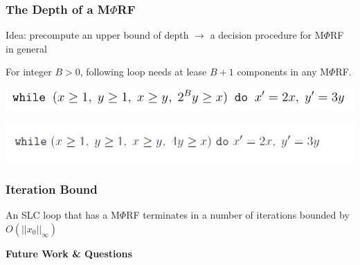 \documentclass[11pt]{beamer}
\begin{document}
\begin{frame}\frametitle{The Depth of a M$\Phi$RF}
Idea:  precompute an upper bound of depth $\rightarrow$ a decision procedure for M$\Phi$RF in general


\begin{theorem}
For integer $B > 0$, following loop needs at lease $B+1$ components in any M$\Phi$RF.
\begin{center}
\includegraphics[scale = 0.4]{5.png}

\end{center}
\begin{example}

\begin{center}
\includegraphics[scale = 0.4]{8.png}

\end{center}
\end{example}
\end{theorem}
\end{frame}


\begin{frame}\frametitle{Iteration Bound}
\begin{theorem}

An SLC loop that has a M$\Phi$RF terminates in a number of iterations bounded by $O(||x_0||_{\infty})$
\end{theorem}

\end{frame}

\begin{frame}
\begin{center}
\textbf{Future Work \& Questions}
\end{center}
\end{frame}
\end{document}

